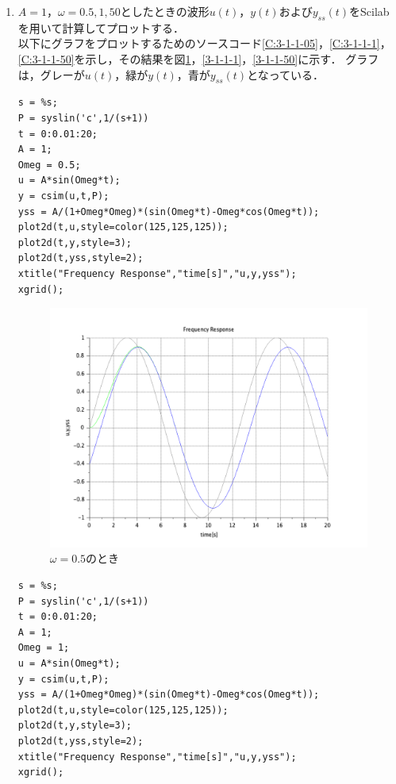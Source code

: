 \documentclass[a4paper,11pt]{jsarticle}
\begin{document}
\begin{enumerate}
  \item $A=1$，$\omega = 0.5, 1, 50$としたときの波形$u(t)$，$y(t)$および$y_{ss}(t)$をScilabを用いて計算してプロットする．\\
        以下にグラフをプロットするためのソースコード\ref{C:3-1-1-05}，\ref{C:3-1-1-1}，\ref{C:3-1-1-50}を示し，その結果を図\ref{3-1-1-05}，\ref{3-1-1-1}，\ref{3-1-1-50}に示す．
        グラフは，グレーが$u(t)$，緑が$y(t)$，青が$y_{ss}(t)$となっている．
        \begin{lstlisting}[caption=図\ref{3-1-1-05}をプロットするコード, label=C:3-1-1-05]
s = %s;
P = syslin('c',1/(s+1))
t = 0:0.01:20;
A = 1;
Omeg = 0.5;
u = A*sin(Omeg*t);
y = csim(u,t,P);
yss = A/(1+Omeg*Omeg)*(sin(Omeg*t)-Omeg*cos(Omeg*t));
plot2d(t,u,style=color(125,125,125));
plot2d(t,y,style=3);
plot2d(t,yss,style=2);
xtitle("Frequency Response","time[s]","u,y,yss");
xgrid();
      \end{lstlisting}
        \begin{figure}[H]
          \centering
          \includegraphics[width=0.8\linewidth]{picture/3-1-1-05.png}
          \caption{$\omega=0.5$のとき}
          \label{3-1-1-05}
        \end{figure}
        \begin{lstlisting}[caption=図\ref{3-1-1-1}をプロットするコード, label=C:3-1-1-1]
s = %s;
P = syslin('c',1/(s+1))
t = 0:0.01:20;
A = 1;
Omeg = 1;
u = A*sin(Omeg*t);
y = csim(u,t,P);
yss = A/(1+Omeg*Omeg)*(sin(Omeg*t)-Omeg*cos(Omeg*t));
plot2d(t,u,style=color(125,125,125));
plot2d(t,y,style=3);
plot2d(t,yss,style=2);
xtitle("Frequency Response","time[s]","u,y,yss");
xgrid();
      \end{lstlisting}
        \begin{figure}[H]
          \centering

\end{figure}
\end{enumerate}
\end{document}
